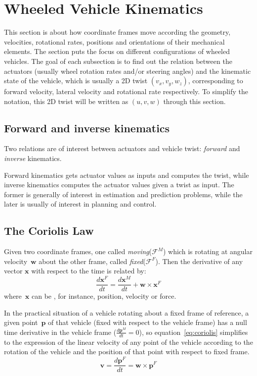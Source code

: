 \section{Wheeled Vehicle Kinematics}
This section is about how coordinate frames move according the geometry, velocities, rotational rates, positions and orientations of their mechanical elements. The section puts the focus on  different configurations of wheeled vehicles. The goal of each subsection is to find out the relation between the actuators (usually wheel rotation rates and/or steering angles) and the kinematic state of the vehicle, which is usually a 2D twist $(v_x, v_y, w_z)$, corresponding to forward velocity, lateral velocity and rotational rate respectively. To simplify the notation, this 2D twist will be written as $(u, v, w)$ through this section. 

\subsection{Forward and inverse kinematics}
Two relations are of interest between actuators and vehicle twist: \textit{forward} and \textit{inverse} kinematics. 

Forward kinematics gets actuator values as inputs and computes the twist, while inverse kinematics computes the actuator values given a twist as input. The former is generally of interest in estimation and prediction problems, while the later is usually of interest in planning and control. 

\subsection{The Coriolis Law}
Given two coordinate frames, one called \textit{moving}($\mathcal{F}^M$) which is rotating at angular velocity~$\mathbf{w}$ about the other frame, called \textit{fixed}($\mathcal{F}^F$). Then the derivative of any vector $\mathbf{x}$ with respect to the time is related by: 
\begin{equation}
\label{eq:coriolis}
 \frac{d\mathbf{x}^F}{dt} = \frac{d\mathbf{x}^M}{dt} + \mathbf{w} \times  \mathbf{x}^F
\end{equation}
where~$\mathbf{x}$ can be , for instance, position, velocity or force. 

In the practical situation of a vehicle rotating about a fixed frame of reference, a given point~$\mathbf{p}$ of that vehicle (fixed with respect to the vehicle frame) has a null time derivative in the vehicle frame ($\frac{d\mathbf{p}^M}{dt} = 0$), so equation~\ref{eq:coriolis} simplifies to the expression of the linear velocity of any point of the vehicle according to the rotation of the vehicle and the position of that point with respect to fixed frame.
\begin{equation}
 \mathbf{v} = \frac{d\mathbf{p}^F}{dt} = \mathbf{w} \times \mathbf{p}^F
\end{equation}


